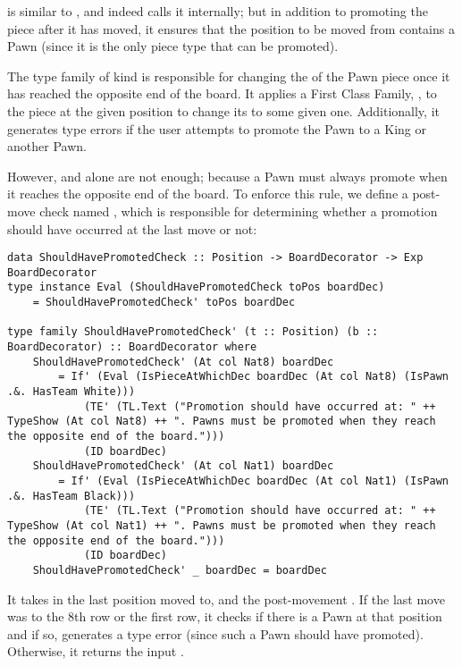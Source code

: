  is similar to , and indeed calls it internally; but in addition to promoting the piece after it has moved, it ensures that the position to be moved from contains a Pawn (since it is the only piece type that can be promoted).

The type family  of kind  is responsible for changing the  of the Pawn piece once it has reached the opposite end of the board. It applies a First Class Family, , to the piece at the given position to change its  to some given one. Additionally, it generates type errors if the user attempts to promote the Pawn to a King or another Pawn.

However,  and  alone are not enough; because a Pawn must always promote when it reaches the opposite end of the board. To enforce this rule, we define a post-move check named , which is responsible for determining whether a promotion should have occurred at the last move or not:

\begin{lstlisting}
data ShouldHavePromotedCheck :: Position -> BoardDecorator -> Exp BoardDecorator
type instance Eval (ShouldHavePromotedCheck toPos boardDec)
    = ShouldHavePromotedCheck' toPos boardDec

type family ShouldHavePromotedCheck' (t :: Position) (b :: BoardDecorator) :: BoardDecorator where
    ShouldHavePromotedCheck' (At col Nat8) boardDec
        = If' (Eval (IsPieceAtWhichDec boardDec (At col Nat8) (IsPawn .&. HasTeam White)))
            (TE' (TL.Text ("Promotion should have occurred at: " ++ TypeShow (At col Nat8) ++ ". Pawns must be promoted when they reach the opposite end of the board.")))
            (ID boardDec)
    ShouldHavePromotedCheck' (At col Nat1) boardDec
        = If' (Eval (IsPieceAtWhichDec boardDec (At col Nat1) (IsPawn .&. HasTeam Black)))
            (TE' (TL.Text ("Promotion should have occurred at: " ++ TypeShow (At col Nat1) ++ ". Pawns must be promoted when they reach the opposite end of the board.")))
            (ID boardDec)
    ShouldHavePromotedCheck' _ boardDec = boardDec
\end{lstlisting}

It takes in the last position moved to, and the post-movement .  If the last move was to the 8th row or the first row, it checks if there is a Pawn at that position and if so, generates a type error (since such a Pawn should have promoted). Otherwise, it returns the input .

